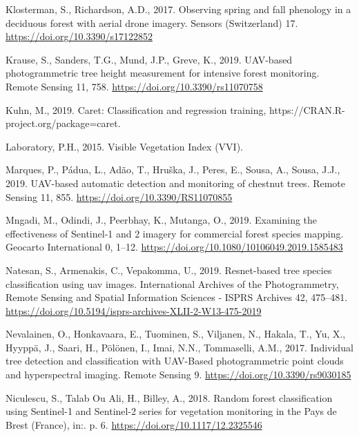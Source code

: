 \documentclass[]{article}
\begin{document}
\leavevmode\hypertarget{ref-Klosterman2017}{}%
Klosterman, S., Richardson, A.D., 2017. Observing spring and fall
phenology in a deciduous forest with aerial drone imagery. Sensors
(Switzerland) 17. \url{https://doi.org/10.3390/s17122852}

\leavevmode\hypertarget{ref-Krause2019a}{}%
Krause, S., Sanders, T.G., Mund, J.P., Greve, K., 2019. UAV-based
photogrammetric tree height measurement for intensive forest monitoring.
Remote Sensing 11, 758. \url{https://doi.org/10.3390/rs11070758}

\leavevmode\hypertarget{ref-R-caret}{}%
Kuhn, M., 2019. Caret: Classification and regression training,
https://CRAN.R-project.org/package=caret.

\leavevmode\hypertarget{ref-Laboratory2015}{}%
Laboratory, P.H., 2015. Visible Vegetation Index (VVI).

\leavevmode\hypertarget{ref-Marques2019a}{}%
Marques, P., Pádua, L., Adão, T., Hruška, J., Peres, E., Sousa, A.,
Sousa, J.J., 2019. UAV-based automatic detection and monitoring of
chestnut trees. Remote Sensing 11, 855.
\url{https://doi.org/10.3390/RS11070855}

\leavevmode\hypertarget{ref-Mngadi2019}{}%
Mngadi, M., Odindi, J., Peerbhay, K., Mutanga, O., 2019. Examining the
effectiveness of Sentinel-1 and 2 imagery for commercial forest species
mapping. Geocarto International 0, 1--12.
\url{https://doi.org/10.1080/10106049.2019.1585483}

\leavevmode\hypertarget{ref-Natesan2019}{}%
Natesan, S., Armenakis, C., Vepakomma, U., 2019. Resnet-based tree
species classification using uav images. International Archives of the
Photogrammetry, Remote Sensing and Spatial Information Sciences - ISPRS
Archives 42, 475--481.
\url{https://doi.org/10.5194/isprs-archives-XLII-2-W13-475-2019}

\leavevmode\hypertarget{ref-Nevalainen2017}{}%
Nevalainen, O., Honkavaara, E., Tuominen, S., Viljanen, N., Hakala, T.,
Yu, X., Hyyppä, J., Saari, H., Pölönen, I., Imai, N.N., Tommaselli,
A.M., 2017. Individual tree detection and classification with UAV-Based
photogrammetric point clouds and hyperspectral imaging. Remote Sensing
9. \url{https://doi.org/10.3390/rs9030185}

\leavevmode\hypertarget{ref-Niculescu2018}{}%
Niculescu, S., Talab Ou Ali, H., Billey, A., 2018. Random forest
classification using Sentinel-1 and Sentinel-2 series for vegetation
monitoring in the Pays de Brest (France), in:. p. 6.
\url{https://doi.org/10.1117/12.2325546}
\end{document}
